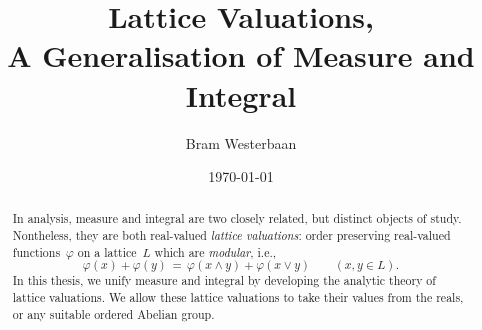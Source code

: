 \documentclass[main.tex]{subfiles}
\begin{document}
\title[A Generalisation of Measure and Integral]{Lattice Valuations,\\
A Generalisation of Measure and Integral}

\author[A.A.~Westerbaan]{Bram Westerbaan}
\date{\today \quad{\tiny \version}}
\maketitle

\begin{abstract}
In analysis,
measure and integral are two closely related,
but distinct objects of study.
Nontheless,
they are both real-valued \emph{lattice valuations}:
order preserving real-valued functions~$\varphi$
on a lattice~$L$
which are \emph{modular}, i.e.,
\begin{equation*}
\varphi(x) + \varphi(y) 
\,=\, 
\varphi(x\wedge y) + \varphi(x\vee y)\qquad(x,y\in L).
\end{equation*}
In this thesis,
we unify measure and integral
by developing the analytic theory of lattice valuations.
We allow these lattice valuations
to take their values from the reals,
or any suitable ordered Abelian group.
\end{abstract}
\end{document}
